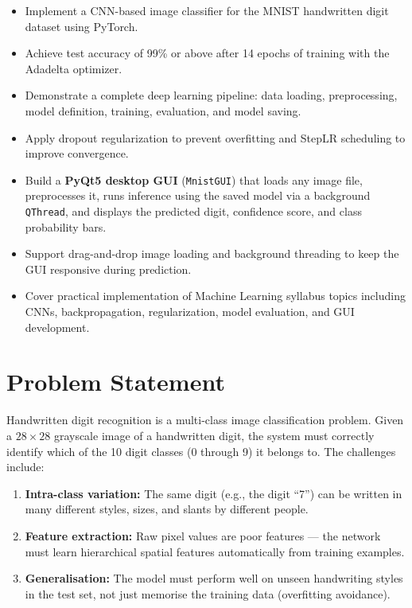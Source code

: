 \documentclass[12pt,a4paper,openany]{report}
\begin{document}
\begin{itemize}
    \item Implement a CNN-based image classifier for the MNIST handwritten digit dataset using PyTorch.
    \item Achieve test accuracy of 99\% or above after 14 epochs of training with the Adadelta optimizer.
    \item Demonstrate a complete deep learning pipeline: data loading, preprocessing, model definition, training, evaluation, and model saving.
    \item Apply dropout regularization to prevent overfitting and StepLR scheduling to improve convergence.
    \item Build a \textbf{PyQt5 desktop GUI} (\texttt{MnistGUI}) that loads any image file, preprocesses it, runs inference using the saved model via a background \texttt{QThread}, and displays the predicted digit, confidence score, and class probability bars.
    \item Support drag-and-drop image loading and background threading to keep the GUI responsive during prediction.
    \item Cover practical implementation of Machine Learning syllabus topics including CNNs, backpropagation, regularization, model evaluation, and GUI development.
\end{itemize}

\section{Problem Statement}

Handwritten digit recognition is a multi-class image classification problem. Given a $28 \times 28$ grayscale image of a handwritten digit, the system must correctly identify which of the 10 digit classes (0 through 9) it belongs to. The challenges include:
\begin{enumerate}
    \item \textbf{Intra-class variation:} The same digit (e.g., the digit ``7'') can be written in many different styles, sizes, and slants by different people.
    \item \textbf{Feature extraction:} Raw pixel values are poor features --- the network must learn hierarchical spatial features automatically from training examples.
    \item \textbf{Generalisation:} The model must perform well on unseen handwriting styles in the test set, not just memorise the training data (overfitting avoidance).
\end{enumerate}
\end{document}
